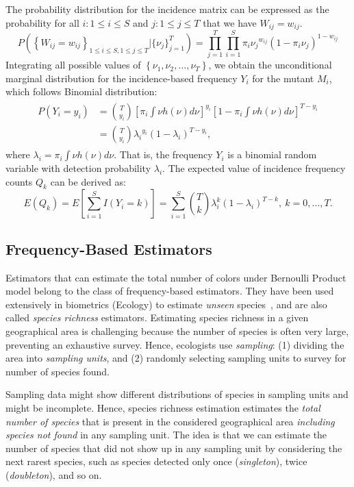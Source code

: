 \documentclass[sigconf]{acmart}
\begin{document}
The probability distribution for the incidence matrix can be expressed as the
probability for all $i:1\leq i \leq S $ and $j:1\leq j\leq T$ that we have $W_{ij} = w_{ij}$.
\small
\begin{displaymath}
    P\left(\left\{W_{ij}=w_{ij}\right\}_{1\leq i\leq S,1\leq j\leq T}|\{\nu_{j}\}_{j=1}^T \right)= \prod_{j=1}^{T}\prod_{i=1}^{S} {\pi_i \nu_j}^{w_{ij}} (1-{\pi_i \nu_j})^{1-w_{ij}}
\end{displaymath}
\normalsize
Integrating all possible values of $\left\{\nu_1, \nu_2,\dots,\nu_T \right\}$, we obtain the unconditional marginal distribution for the incidence-based frequency $Y_i$ for the mutant $M_i$,
which follows Binomial distribution:
\begin{gather*}
    \begin{split}
        P(Y_i=y_i)&={T \choose y_i}\left[\pi_i\int \nu h(\nu) d\nu\right]^{y_i} \left[1-\pi_i\int \nu h(\nu) d\nu \right]^{T-y_i} \\
        &={T \choose y_i}{\lambda_i}^{y_i} (1-{\lambda_i})^{T-y_i},
    \end{split}
\end{gather*}
where  $\lambda_i=\pi_i \int \nu h(\nu)d\nu$.
That is, the frequency $Y_i$ is a binomial random variable with detection probability $\lambda_i$.
The expected value of incidence frequency counts $Q_k$ can be derived as:
\[
    E(Q_k)=E\left[ \sum_{i=1}^{S}I(Y_i=k)  \right]=\sum_{i=1}^{S}{T \choose k}\lambda_{i}^k(1-\lambda_{i})^{T-k}, ~k=0,\dots,T.
\]

\subsection{Frequency-Based Estimators}
\label{sec:estimators}
Estimators that can estimate the total number of colors under Bernoulli Product model belong to the class of frequency-based estimators.
They have been used extensively in biometrics (Ecology)
to estimate \emph{unseen} species~\cite{chao2016species}, and are also called \emph{species richness} estimators.
Estimating species richness in a given geographical area is challenging
because the number of species is often very large,
preventing an exhaustive survey.
Hence, ecologists use \emph{sampling}:
(1) dividing the area into \emph{sampling units}, and %
(2) randomly selecting sampling units to survey for number of species found.

Sampling data might show different distributions of species in sampling units
and might be incomplete.
Hence, %
species richness estimation %
estimates the \emph{total number of species} that is present
in the considered geographical area \emph{including species not found} in
any sampling unit.
The idea is that we can estimate the number
of species that did not show up in any sampling unit 
by considering the next rarest species, such as species
detected only once (\emph{singleton}), twice (\emph{doubleton}),
and so on.
\end{document}
